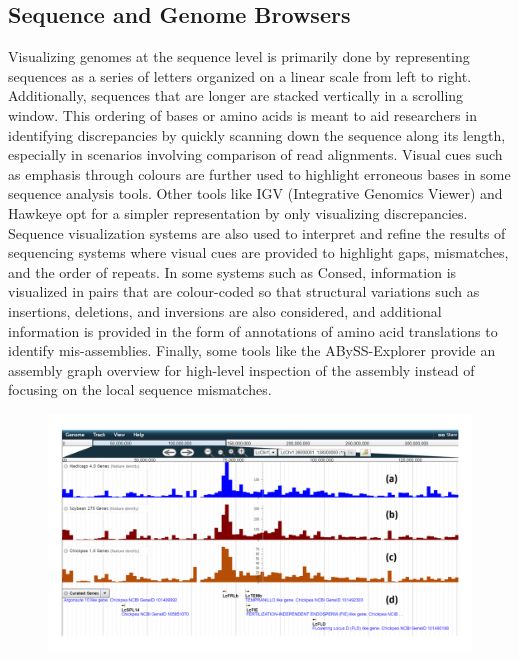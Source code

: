 \subsection{Sequence and Genome Browsers}
Visualizing genomes at the sequence level is primarily done by representing sequences
as a series of letters organized on a linear scale from left to right. Additionally, sequences that are longer are stacked vertically in a scrolling window. This ordering of bases or amino acids is meant to aid researchers in identifying discrepancies by quickly scanning down the sequence along its length, especially in scenarios involving comparison of read alignments. Visual cues such as emphasis through colours are further used to highlight erroneous bases in some sequence analysis tools\cite{consed,ewing1998base}. Other tools like IGV (Integrative Genomics Viewer)\cite{thorvaldsdottir2013integrative} and Hawkeye\cite{schatz2007hawkeye} opt for a simpler representation by only visualizing discrepancies. Sequence visualization systems are also used to interpret and refine the results of sequencing systems where visual cues are provided to highlight gaps, mismatches, and the order of repeats\cite{bonfield1995new,consed}. In some systems such as Consed\cite{consed}, information is visualized in pairs that are colour-coded so that structural variations such as insertions, deletions, and inversions are also considered, and additional information is provided in the form of annotations of amino acid translations to identify mis-assemblies. Finally, some tools like the ABySS-Explorer provide an assembly graph overview for high-level inspection of the assembly instead of focusing on the local sequence mismatches\cite{nielsen2009abyss}. 


\begin{figure}
  \centering
  \includegraphics[width=1\linewidth]{images/ch_2_jbrowse.PNG}
  \label{fig:ch_2_jbrowse}
\end{figure}


